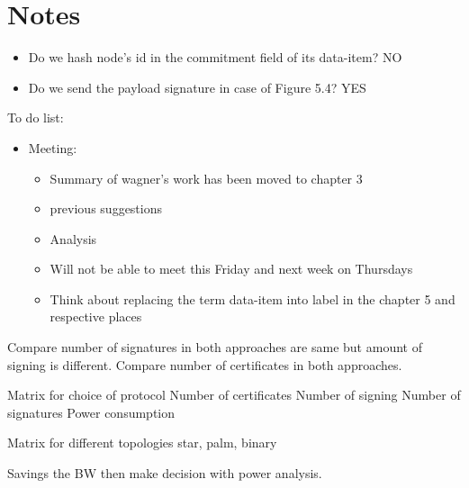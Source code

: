 \chapter{Notes}

\begin{itemize}
	\item Do we hash node's id in the commitment field of its data-item? NO
	\item Do we send the payload signature in case of Figure 5.4? YES
\end{itemize}

To do list:
\begin{itemize}
	\item Meeting: 
	\begin{itemize}
		\item Summary of wagner's work has been moved to chapter 3
		\item previous suggestions
		\item Analysis
		\item Will not be able to meet this Friday and next week on Thursdays
		\item Think about replacing the term data-item into label in the chapter 5 and respective places
	\end{itemize}

\end{itemize}
	
	Compare number of signatures in both approaches are same but amount of signing is different.
	Compare number of certificates in both approaches.

	Matrix for choice of protocol
		Number of certificates
		Number of signing
		Number of signatures
		Power consumption

	Matrix for different topologies
		star, palm, binary 
		
	Savings the BW then make decision with power analysis.
